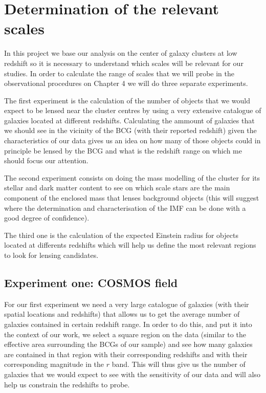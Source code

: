 \chapter{Determination of the relevant scales}

In this project we base our analysis on the center of galaxy clusters at low redshift so it is necessary to understand which scales will be relevant for our studies. In order to calculate the range of scales that we will probe in the observational procedures on Chapter 4 we will do three separate experiments. 

The first experiment is the calculation of the number of objects that we would expect to be lensed near the cluster centres by using a very extensive catalogue of galaxies located at different redshifts. Calculating the ammount of galaxies that we should see in the vicinity of the BCG (with their reported redshift) given the characteristics of our data gives us an idea on how many of those objects could in principle be lensed by the BCG and what is the redshift range on which me should focus our attention. 

The second experiment consists on doing the mass modelling of the cluster for its stellar and dark matter content to see on which scale stars are the main component of the enclosed mass that lenses background objects (this will suggest where the determination and characterisation of the IMF can be done with a good degree of confidence). 

The third one is the calculation of the expected Einstein radius for objects located at differents redshifts which will help us define the most relevant regions to look for lensing candidates.

\section{Experiment one: COSMOS field}

For our first experiment we need a very large catalogue of galaxies (with their spatial locations and redshifts) that allows us to get the average number of galaxies contained in certain redshift range. In order to do this, and put it into the context of our work, we select a square region on the data (similar to the effective area surrounding the BCGs of our sample) and see how many galaxies are contained in that region with their corresponding redshifts and with their corresponding magnitude in the $r$ band. This will thus give us the number of galaxies that we would expect to see with the sensitivity of our data and will also help us constrain the redshifts to probe. 

